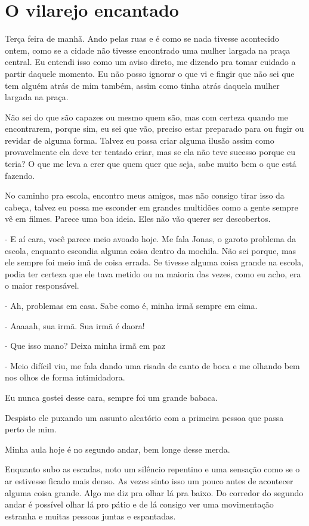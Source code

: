 \chapter{O vilarejo encantado}
Terça feira de manhã. Ando pelas ruas e é como se nada tivesse acontecido ontem, como se a cidade não tivesse encontrado uma mulher largada na praça central. Eu entendi isso como um aviso direto, me dizendo pra tomar cuidado a partir daquele momento. Eu não posso ignorar o que vi e fingir que não sei que tem alguém atrás de mim também, assim como tinha atrás daquela mulher largada na praça. 

Não sei do que são capazes ou mesmo quem são, mas com certeza quando me encontrarem, porque sim, eu sei que vão, preciso estar preparado para ou fugir ou revidar de alguma forma. Talvez eu possa criar alguma ilusão assim como provavelmente ela deve ter tentado criar, mas se ela não teve sucesso porque eu teria? O que me leva a crer que quem quer que seja, sabe muito bem o que está fazendo.

No caminho pra escola, encontro meus amigos, mas não consigo tirar isso da cabeça, talvez eu possa me esconder em grandes multidões como a gente sempre vê em filmes. Parece uma boa ideia. Eles não vão querer ser descobertos.

- E aí cara, você parece meio avoado hoje. Me fala Jonas, o garoto problema da escola, enquanto escondia alguma coisa dentro da mochila. Não sei porque, mas ele sempre foi meio imã de coisa errada. Se tivesse alguma coisa grande na escola, podia ter certeza que ele tava metido ou na maioria das vezes, como eu acho, era o maior responsável.

- Ah, problemas em casa. Sabe como é, minha irmã sempre em cima.

- Aaaaah, sua irmã. Sua irmã é daora!

- Que isso mano? Deixa minha irmã em paz

- Meio difícil viu, me fala dando uma risada de canto de boca e me olhando bem nos olhos de forma intimidadora.

Eu nunca gostei desse cara, sempre foi um grande babaca.

Despisto ele puxando um assunto aleatório com a primeira pessoa que passa perto de mim.

Minha aula hoje é no segundo andar, bem longe desse merda.

Enquanto subo as escadas, noto um silêncio repentino e uma sensação como se o ar estivesse ficado mais denso. As vezes sinto isso um pouco antes de acontecer alguma coisa grande. Algo me diz pra olhar lá pra baixo. Do corredor do segundo andar é possível olhar lá pro pátio e de lá consigo ver uma movimentação estranha e muitas pessoas juntas e espantadas.

